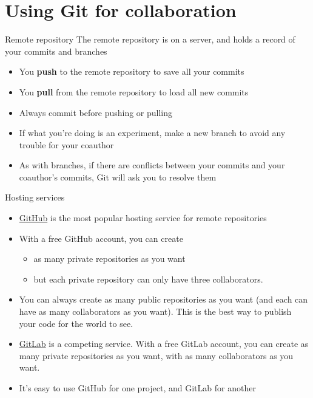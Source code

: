 \documentclass{beamer}
\begin{document}
\section{Using Git for collaboration}

\begin{frame}{Remote repository}
The remote repository is on a server, and holds a record of your commits and branches
\begin{itemize}
\item You \textbf{push} to the remote repository to save all your commits
\item You \textbf{pull} from the remote repository to load all new commits
\item Always commit before pushing or pulling
\item If what you're doing is an experiment, make a new branch to avoid any trouble for your coauthor
\item As with branches, if there are conflicts between your commits and your coauthor's commits, Git will ask you to resolve them
\end{itemize}
\end{frame}

\begin{frame}{Hosting services}
\begin{itemize}
\item \href{https://github.com/}{GitHub} is the most popular hosting service for remote repositories
\item With a free GitHub account, you can create
\begin{itemize}
\item as many private repositories as you want
\item but each private repository can only have three collaborators.
\end{itemize}
\item You can always create as many public repositories as you want (and each can have as many collaborators as you want). This is the best way to publish your code for the world to see.
\item \href{https://about.gitlab.com/}{GitLab} is a competing service. With a free GitLab account, you can create as many private repositories as you want, with as many collaborators as you want.
\item It's easy to use GitHub for one project, and GitLab for another
\end{itemize}
\end{frame}
\end{document}
